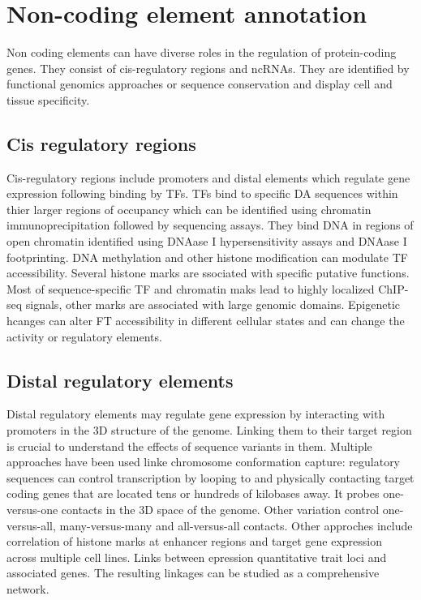 \section{Non-coding element annotation}
Non coding elements can have diverse roles in the regulation of protein-coding genes.
They consist of cis-regulatory regions and ncRNAs.
They are identified by functional genomics approaches or sequence conservation and display cell and tissue specificity.

	\subsection{Cis regulatory regions}
	Cis-regulatory regions include promoters and distal elements which regulate gene expression following binding by TFs.
	TFs bind to specific DA sequences within thier larger regions of occupancy which can be identified using chromatin immunoprecipitation followed by sequencing assays.
	They bind DNA in regions of open chromatin identified using DNAase I hypersensitivity assays and DNAase I footprinting.
	DNA methylation and other histone modification can modulate TF accessibility.
	Several histone marks are ssociated with specific putative functions.
	Most of sequence-specific TF and chromatin maks lead to highly localized ChIP-seq signals, other marks are associated with large genomic domains.
	Epigenetic hcanges can alter FT accessibility in  different cellular states and can change the activity or regulatory elements.


	\subsection{Distal regulatory elements}
	Distal regulatory elements may regulate gene expression by interacting with promoters in the 3D structure of the genome.
	Linking them to their target region is crucial to understand the effects of sequence variants in them.
	Multiple approaches have been used linke chromosome conformation capture: regulatory sequences can control transcription by looping to and physically contacting target coding genes that are located tens or hundreds of kilobases away.
	It probes one-versus-one contacts in the 3D space of the genome.
	Other variation control one-versus-all, many-versus-many and all-versus-all contacts.
	Other approches include correlation of histone marks at enhancer regions and target gene expression across multiple cell lines.
	Links between epression quantitative trait loci and associated genes.
	The resulting linkages can be studied as a comprehensive network.

